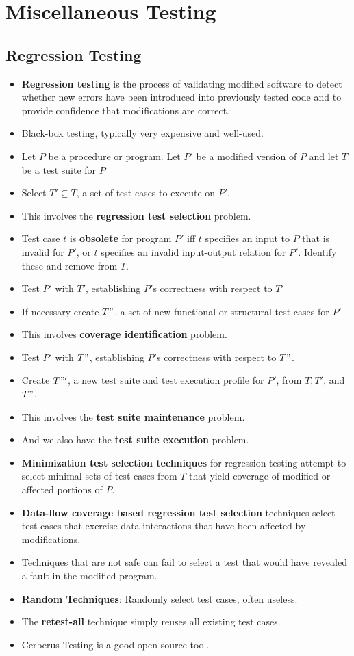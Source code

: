 \documentclass[a4paper]{article}
\begin{document}
\section{Miscellaneous Testing}
\subsection{Regression Testing}
\begin{itemize}
    \item \textbf{Regression testing} is the process of validating modified software to detect whether new errors have been introduced into previously tested code and to provide confidence that modifications are correct.
    \item Black-box testing, typically very expensive and well-used.
    \item Let $P$ be a procedure or program. Let $P'$ be a modified version of $P$ and let $T$ be a test suite for $P$
    \item Select $T'\subseteq T$, a set of test cases to execute on $P'$.
    \item This involves the \textbf{regression test selection} problem.
    \item Test case $t$ is \textbf{obsolete} for program $P'$ iff $t$ specifies an input to $P$ that is invalid for $P'$, or $t$ specifies an invalid input-output relation for $P'$. Identify these and remove from $T$.
    \item Test $P'$ with $T'$, establishing $P'$s correctness with respect to $T'$
    \item If necessary create $T"$, a set of new functional or structural test cases for $P'$
    \item This involves \textbf{coverage identification} problem.
    \item Test $P'$ with $T"$, establishing $P'$s correctness with respect to $T"$.
    \item Create $T"'$, a new test suite and test execution profile for $P'$, from $T,T'$, and $T"$.
    \item This involves the \textbf{test suite maintenance} problem.
    \item And we also have the \textbf{test suite execution} problem.
    \item \textbf{Minimization test selection techniques} for regression testing attempt to select minimal sets of test cases from $T$ that yield coverage of modified or affected portions of $P$.
    \item \textbf{Data-flow coverage based regression test selection} techniques select test cases that exercise data interactions that have been affected by modifications.
    \item Techniques that are not safe can fail to select a test that would have revealed a fault in the modified program.
    \item \textbf{Random Techniques}: Randomly select test cases, often useless.
    \item The \textbf{retest-all} technique simply reuses all existing test cases.
    \item Cerberus Testing is a good open source tool.
\end{itemize}
\end{document}

